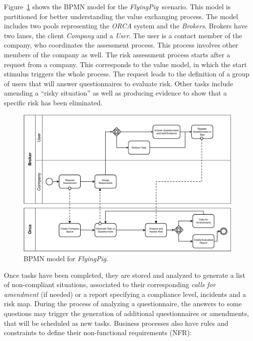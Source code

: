 \documentclass{singlecol-new}
\theoremstyle{TH}{
\newtheorem{lemma}{Lemma}
\newtheorem{theorem}[lemma]{Theorem}
\newtheorem{corrolary}[lemma]{Corrolary}
\newtheorem{conjecture}[lemma]{Conjecture}
\newtheorem{proposition}[lemma]{Proposition}
\newtheorem{claim}[lemma]{Claim}
\newtheorem{stheorem}[lemma]{Wrong Theorem}
\newtheorem{algorithm}{Algorithm}
}
\theoremstyle{THrm}{
\newtheorem{definition}{Definition}[section]
\newtheorem{question}{Question}[section]
\newtheorem{remark}{Remark}
\newtheorem{scheme}{Scheme}
}
\theoremstyle{THhit}{
\newtheorem{case}{Case}[section]
}
\theoremstyle{THhsl}{
\newtheorem{example}{Example}
}
\def\FlyingPig{\textsl{FlyingPig}\xspace}
\begin{document}
Figure~\ref{fig:BPMNmodel} shows the BPMN model
for the \FlyingPig\ scenario. This model is partitioned for better understanding the value exchanging process.
The model includes two pools representing the \textsl{ORCA} system and the \textsl{Brokers}.
Brokers have two lanes, the client \textsl{Company} and a \textsl{User}.
The user is a contact member of the company, who  coordinates the assessment process.
This process  involves other members of the company as well.
%
The risk assessment process starts after a request from a company.
This corresponds to the value model, in which the start stimulus triggers the whole process.
The request leads to the definition of a group of users that will answer questionnaires to evaluate risk.
Other tasks include amending a ``risky situation'' as well as producing evidence to show that a specific risk has been eliminated\footnotemark {}.

\begin{figure}[h]
\centering
\includegraphics[width=1\textwidth]{./figures/BPMN_GCP.pdf}
\caption{BPMN model for \FlyingPig.\label{fig:BPMNmodel}}
\end{figure}

Once tasks have been completed, they are stored and analyzed to generate a list of non-compliant situations, associated to their corresponding \textit{calls for amendment} (if needed) or a report specifying a compliance level, incidents and a risk map.
During the process of analyzing a questionnaire, the answers to some questions may trigger the generation of additional questionnaires or amendments, that will be scheduled as new tasks.
Business processes also have rules and constraints to define their non-functional requirements (NFR):
\end{document}
